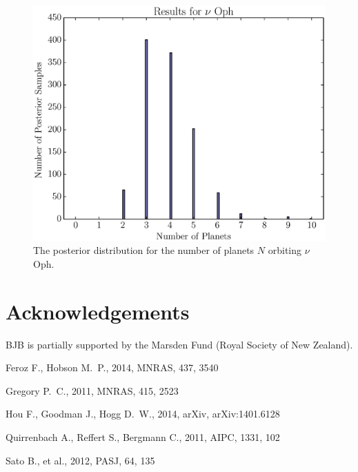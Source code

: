 \documentclass[useAMS,usenatbib]{mn2e}
\begin{document}
\begin{figure}
\includegraphics[scale=0.5]{Figures/nu_oph_N.eps}
\caption{The posterior distribution for the number of planets $N$ orbiting
$\nu$ Oph.\label{fig:nu_oph_N}}
\end{figure}

\vspace{-0.5cm}
\section*{Acknowledgements}
BJB is partially
supported by the Marsden Fund (Royal Society of New Zealand).

\begin{thebibliography}{99}
 Feroz F., Hobson M.~P., 2014, MNRAS, 437, 3540 

Gregory P.~C., 2011, MNRAS, 415, 2523 

 Hou F., Goodman J., Hogg D.~W., 2014, arXiv, arXiv:1401.6128 

 Quirrenbach A., Reffert S., Bergmann C., 2011, AIPC, 1331, 102 

Sato B., et al., 2012, PASJ, 64, 135 
\end{thebibliography}
\end{document}
